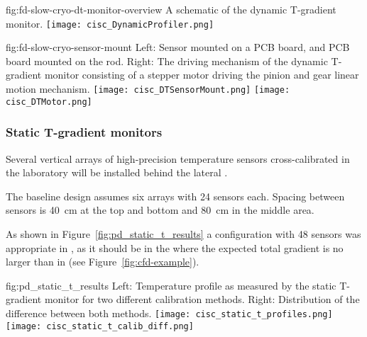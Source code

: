 \begin{dunefigure}{fig:fd-slow-cryo-dt-monitor-overview}
  {%
  A schematic of the dynamic T-gradient monitor.}
 \texttt{[image: cisc\_DynamicProfiler.png]}
\end{dunefigure}
\begin{dunefigure}{fig:fd-slow-cryo-sensor-mount}
  {Left: Sensor mounted on a PCB board, and PCB board mounted on the rod. Right:
    The driving mechanism of the dynamic T-gradient monitor consisting of a stepper motor driving the pinion and gear linear motion mechanism. }
  \texttt{[image: cisc\_DTSensorMount.png]}
  \hspace{3cm}%
  \texttt{[image: cisc\_DTMotor.png]}
\end{dunefigure}


\subsubsection{Static T-gradient monitors}
\label{sec:fdgen-slow-cryo-static-therm}

Several vertical arrays of high-precision temperature sensors cross-calibrated in the laboratory will be installed behind the lateral .  

The baseline design assumes six arrays with \num{24} sensors each. 
Spacing between sensors
is \SI{40}{cm} at the top and bottom and \SI{80}{cm} in the middle area.

As shown in Figure~\ref{fig:pd_static_t_results} a configuration with \num{48} sensors was appropriate in , as it should be in the  where the expected total gradient is no larger than in  (see Figure~\ref{fig:cfd-example}). 

\begin{dunefigure}{fig:pd_static_t_results}{
 Left: Temperature profile as measured by the static T-gradient monitor for two different calibration methods. Right: Distribution of the difference between both methods.}
  \texttt{[image: cisc\_static\_t\_profiles.png]}%
  \texttt{[image: cisc\_static\_t\_calib\_diff.png]}%
\end{dunefigure}



